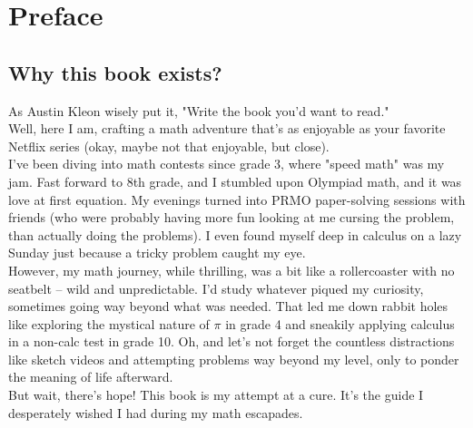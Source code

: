 \chapter{Preface}
\section{Why this book exists?}
As Austin Kleon wisely put it, "Write the book you'd want to read."\\
Well, here I am, crafting a math adventure that's as enjoyable as your favorite Netflix series (okay, maybe not that enjoyable, but close).\\
I've been diving into math contests since grade 3, where "speed math" was my jam. Fast forward to 8th grade, and I stumbled upon Olympiad math, and it was love at first equation. My evenings turned into PRMO paper-solving sessions with friends (who were probably having more fun looking at me cursing the problem, than actually doing the problems). I even found myself deep in calculus on a lazy Sunday just because a tricky problem caught my eye.\\

However, my math journey, while thrilling, was a bit like a rollercoaster with no seatbelt – wild and unpredictable. I'd study whatever piqued my curiosity, sometimes going way beyond what was needed. That led me down rabbit holes like exploring the mystical nature of $\pi$ in grade 4 and sneakily applying calculus in a non-calc test in grade 10. Oh, and let's not forget the countless distractions like sketch videos and attempting problems way beyond my level, only to ponder the meaning of life afterward.\\

But wait, there's hope! This book is my attempt at a cure. It's the guide I desperately wished I had during my math escapades.\\
